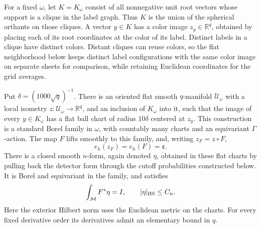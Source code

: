 For a fixed \(\omega\), let \(K=K_\omega\) consist of all nonnegative
unit root vectors whose support is a clique in the label graph.  Thus
\(K\) is the union of the spherical orthants on those cliques.  A vector
\(y\in K\) has a color image \(z_y\in\mathbb R^q\), obtained by placing
each of its root coordinates at the color of its label.  Distinct labels
in a clique have distinct colors.  Distant cliques can reuse colors, so
the flat neighborhood below keeps distinct label configurations with the
same color image on separate sheets for comparison, while retaining
Euclidean coordinates for the grid averages.

\begin{lemma}\label{lem:transfer-flat}
Put \(\delta=(1000\sqrt q)^{-1}\).  There is an oriented flat smooth
\(q\)-manifold \(\mathcal U_\omega\) with a local isometry
\(z:\mathcal U_\omega\to\mathbb R^q\), and an inclusion of \(K_\omega\)
into it, such that the image of every \(y\in K_\omega\) has a flat ball
chart of radius \(10\delta\) centered at \(z_y\).  This construction is
a standard Borel family in \(\omega\), with countably many charts and an
equivariant \(\Gamma\)-action.  The map \(F\) lifts smoothly to this
family, and, writing \(z_F=z\circ F\),
\[
                         e_h(z_F)=e_h(F)=\mathfrak e.
\]
There is a closed smooth \(n\)-form, again denoted \(\eta\), obtained
in these flat charts by pulling back the detector form through the cutoff
probabilities constructed below.  It is Borel and equivariant in the
family, and satisfies
\begin{equation}\label{eq:transfer-form}
        \int_{\mathcal M}F^*\eta=I,\qquad |\eta|_{\mathrm{HS}}\leq C_n.
\end{equation}
Here the exterior Hilbert norm uses the Euclidean metric on the charts.
For every fixed derivative order its derivatives admit an elementary
bound in \(q\).
\end{lemma}

